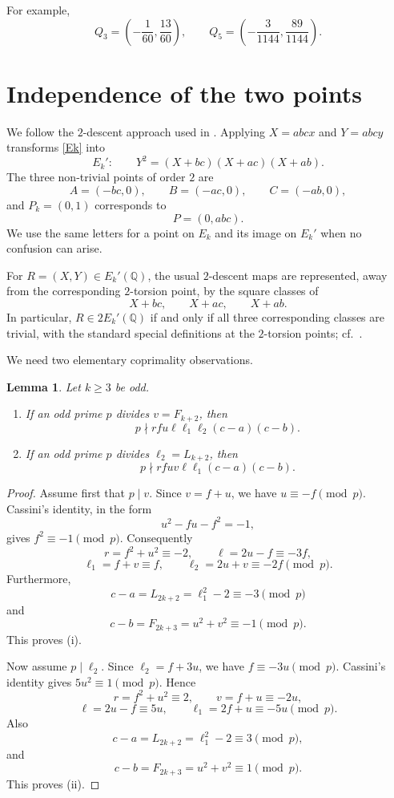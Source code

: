 \documentclass[11pt]{amsart}
\newtheorem{lemma}[theorem]{Lemma}
\theoremstyle{remark}
\newcommand{\Q}{\mathbb{Q}}
\begin{document}
For example,
\[
 Q_3=\left(-\frac1{60},\frac{13}{60}\right),\qquad
 Q_5=\left(-\frac3{1144},\frac{89}{1144}\right).
\]

\section{Independence of the two points}

We follow the $2$-descent approach used in
\cite{DujellaMT,DujellaPetho,DujellaParam}. 
Applying $X = abcx$ and $Y = abcy$ transforms \eqref{Ek} into
\begin{equation}\label{E0}
 E_k':\qquad
 Y^2=(X+bc)(X+ac)(X+ab). 
\end{equation}
The three non-trivial points of order $2$ are
\[
 A=(-bc,0),\qquad B=(-ac,0),\qquad C=(-ab,0),
\]
and $P_k=(0,1)$ corresponds to
\[
 P=(0,abc).
\]
We use the same letters for a point on $E_k$ and its image on $E_k'$ when
no confusion can arise.

For $R=(X,Y)\in E_k'(\Q)$, the usual $2$-descent maps are represented,
away from the corresponding $2$-torsion point, by the square classes of
\[
 X+bc,\qquad X+ac,\qquad X+ab.
\]
In particular, $R\in2E_k'(\Q)$ if and only if all three corresponding
classes are trivial, with the standard special definitions at the
$2$-torsion points; cf.\ \cite{DujellaMT}.

We need two elementary coprimality observations.

\begin{lemma}\label{coprime}
Let $k\geq3$ be odd.
\begin{enumerate}[label={\rm (\roman*)}]
\item If an odd prime $p$ divides $v=F_{k+2}$, then
\[
 p\nmid rfu\ell\ell_1\ell_2(c-a)(c-b).
\]
\item If an odd prime $p$ divides $\ell_2=L_{k+2}$, then
\[
 p\nmid rfuv\ell\ell_1(c-a)(c-b).
\]
\end{enumerate}
\end{lemma}

\begin{proof}
Assume first that $p\mid v$.  Since $v=f+u$, we have
$u\equiv-f\pmod p$.  Cassini's identity, in the form
\[
 u^2-fu-f^2=-1,
\]
gives $f^2\equiv-1\pmod p$.  Consequently
\[
 r=f^2+u^2\equiv-2,\qquad
 \ell=2u-f\equiv-3f,
\]
\[
 \ell_1=f+v\equiv f,\qquad
 \ell_2=2u+v\equiv-2f\pmod p.
\]
Furthermore,
\[
 c-a=L_{2k+2}=\ell_1^2-2\equiv-3\pmod p
\]
and
\[
 c-b=F_{2k+3}=u^2+v^2\equiv-1\pmod p.
\]
This proves (i).

Now assume $p\mid\ell_2$.  Since $\ell_2=f+3u$, we have
$f\equiv-3u\pmod p$.  Cassini's identity gives
$5u^2\equiv1\pmod p$.  Hence
\[
 r=f^2+u^2\equiv2,\qquad
 v=f+u\equiv-2u,
\]
\[
 \ell=2u-f\equiv5u,\qquad
 \ell_1=2f+u\equiv-5u\pmod p.
\]
Also
\[
 c-a=L_{2k+2}=\ell_1^2-2\equiv3\pmod p,
\]
and
\[
 c-b=F_{2k+3}=u^2+v^2\equiv1\pmod p.
\]
This proves (ii).
\end{proof}
\end{document}
